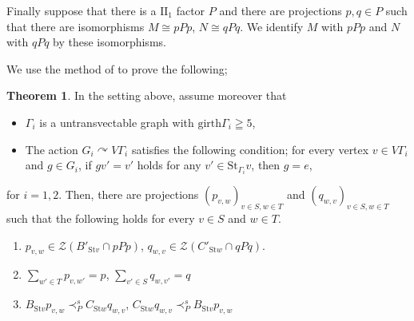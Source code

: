\documentclass{amsart}
\theoremstyle{definition}
\newtheorem{theorem}{Theorem}[section]
\newcommand{\action}{\curvearrowright}
\newcommand{\twoone}{$\mathrm{II}_1$\xspace}
\begin{document}
Finally suppose that there is a \twoone factor $P$ and 
there are projections $p,q\in P$
such that there are isomorphisms $M\cong pPp$, $N\cong qPq$. 
We identify $M$ with $pPp$ and $N$ with $qPq$ by these isomorphisms. 

We use the method of \cite[Proposition 6.4]{hi} to prove the following;




\begin{theorem}
In the setting above, assume moreover that
\begin{itemize}
\item $\Gamma_i$ is a untransvectable graph with $\mathrm{girth}\Gamma_i\geqq 5$, 
\item The action $G_i\action V\Gamma_i$ satisfies the following condition;
for every vertex $v\in V\Gamma_i$ and $g\in G_i$, if $gv'=v'$ holds for any $v'\in \mathrm{St}_{\Gamma_i}v$, then $g=e$, 
\end{itemize}
for $i=1,2$. 
Then, there are projections
$(p_{v,w})_{v\in S, w\in T}$ and $(q_{w,v})_{v\in S, w\in T}$ such that
the following holds for every $v\in S$ and $w\in T$. 
\begin{enumerate}
\item $p_{v,w}\in \mathcal{Z}(B'_{\mathrm{St}v}\cap pPp)$, 
$q_{w,v}\in \mathcal{Z}(C'_{\mathrm{St}w}\cap qPq)$. \\
\item $\sum_{w'\in T} p_{v,w'}=p$, $\sum_{v'\in S} q_{w,v'}=q$  \\
\item $B_{\mathrm{St}v}p_{v,w} \prec^s_P C_{\mathrm{St}w}q_{w,v}$, 
$C_{\mathrm{St}w}q_{w,v} \prec^s_P B_{\mathrm{St}v}p_{v,w}$
\end{enumerate}
\end{theorem}
\end{document}
